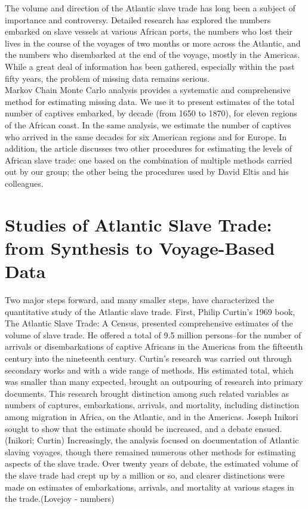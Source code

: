 \documentclass[preprint,12pt]{elsarticle}
\begin{document}



The volume and direction of the Atlantic slave trade has long been a subject of importance and controversy. Detailed research has explored the numbers embarked on slave vessels at various African ports, the numbers who lost their lives in the course of the voyages of two months or more across the Atlantic, and the numbers who disembarked at the end of the voyage, mostly in the Americas. While a great deal of information has been gathered, especially within the past fifty years, the problem of missing data remains serious.\\

Markov Chain Monte Carlo analysis provides a systematic and comprehensive method for estimating missing data. We use it to present estimates of the total number of captives embarked, by decade (from 1650 to 1870), for eleven regions of the African coast. In the same analysis, we estimate the number of captives who arrived in the same decades for six American regions and for Europe. In addition, the article discusses two other procedures for estimating the levels of African slave trade: one based on the combination of multiple methods carried out by our group; the other being the procedures used by David Eltis and his colleagues. 



\section{Studies of Atlantic Slave Trade: from Synthesis to Voyage-Based Data}

Two major steps forward, and many smaller steps, have characterized the quantitative study of the Atlantic slave trade. First, Philip Curtin’s 1969 book, The Atlantic Slave Trade: A Census, presented comprehensive estimates of the volume of slave trade. He offered a total of 9.5 million persons--for the number of arrivals or disembarkations of captive Africans in the Americas from the fifteenth century into the nineteenth century. Curtin’s research was carried out through secondary works and with a wide range of methods. His estimated total, which was smaller than many expected, brought an outpouring of research into primary documents. This research brought distinction among such related variables as numbers of captures, embarkations, arrivals, and mortality, including distinction among migration in Africa, on the Atlantic, and in the Americas. Joseph Inikori sought to show that the estimate should be increased, and a debate ensued.(Inikori; Curtin)  Increasingly, the analysis focused on documentation of Atlantic slaving voyages, though there remained numerous other methods for estimating aspects of the slave trade. Over twenty years of debate, the estimated volume of the slave trade had crept up by a million or so, and clearer distinctions were made on estimates of embarkations, arrivals, and mortality at various stages in the trade.(Lovejoy - numbers)\\ 
\end{document}
